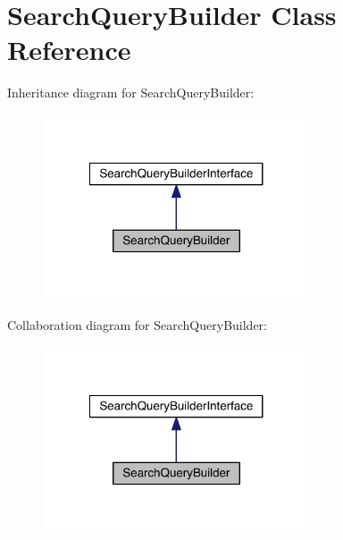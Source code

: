 \hypertarget{classapp_1_1models_1_1core_1_1_search_1_1_search_query_builder}{\section{Search\-Query\-Builder Class Reference}
\label{classapp_1_1models_1_1core_1_1_search_1_1_search_query_builder}
}


Inheritance diagram for Search\-Query\-Builder\-:
\nopagebreak
\begin{figure}[H]
\begin{center}
\leavevmode
\includegraphics[width=224pt]{classapp_1_1models_1_1core_1_1_search_1_1_search_query_builder__inherit__graph}
\end{center}
\end{figure}


Collaboration diagram for Search\-Query\-Builder\-:
\nopagebreak
\begin{figure}[H]
\begin{center}
\leavevmode
\includegraphics[width=224pt]{classapp_1_1models_1_1core_1_1_search_1_1_search_query_builder__coll__graph}
\end{center}
\end{figure}
